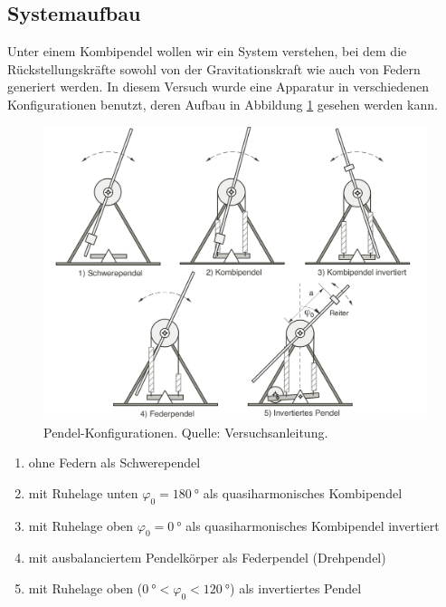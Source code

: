 \subsection{Systemaufbau}
\label{subsec:sysaufbau}

Unter  einem  Kombipendel  wollen  wir  ein  System  verstehen,  bei  dem  die
R\"uckstellungskr\"afte sowohl  von der Gravitationskraft wie  auch von Federn
generiert  werden. In diesem  Versuch  wurde eine  Apparatur in  verschiedenen
Konfigurationen  benutzt, deren  Aufbau  in Abbildung  \ref{fig:pendelKonfigs}
gesehen werden kann.

\begin{figure}[h!]
    \centering
    \includegraphics[width=\textwidth]{images/pendel-konfigs.png}
    \caption{%
        Pendel-Konfigurationen. Quelle: Versuchsanleitung.
    }
    \label{fig:pendelKonfigs}
\end{figure}

\begin{enumerate}
    \item
        ohne Federn als Schwerependel
    \item
        mit Ruhelage unten $\varphi_0 = \SI{180}{\degree}$ als quasiharmonisches Kombipendel
    \item
        mit Ruhelage oben $\varphi_0 = \SI{0}{\degree}$ als quasiharmonisches Kombipendel invertiert
    \item
        mit ausbalanciertem Pendelk\"orper als Federpendel (Drehpendel)
    \item
        mit Ruhelage oben ($\SI{0}{\degree} < \varphi_0 < \SI{120}{\degree}$) als invertiertes Pendel
\end{enumerate}


